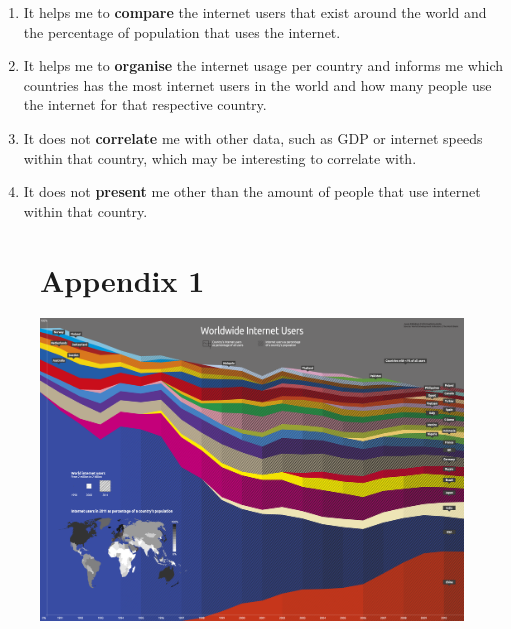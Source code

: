 \documentclass[11pt,a4paper]{article}
\begin{document}
\begin{enumerate}[noitemsep]
	\item It helps me to \textbf{compare} the internet users that exist around the world and the percentage of population that uses the internet.
	\item It helps me to \textbf{organise} the internet usage per country and informs me which countries has the most internet users in the world and how many people use the internet for that respective country.
	\item It does not \textbf{correlate} me with other data, such as GDP or internet speeds within that country, which may be interesting to correlate with.
	\item It does not \textbf{present} me other than the amount of people that use internet within that country.
\end{enumerate}


\begin{figure}
\section*{Appendix 1}
\includegraphics[scale=0.18]{visualisation1}		
\end{figure}
\end{document}
